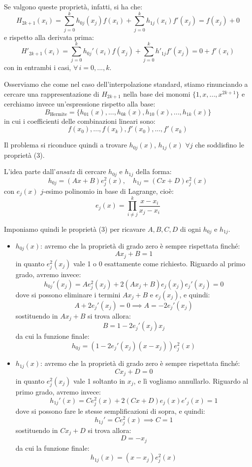 \documentclass[a4paper,11pt]{article}
\begin{document}
Se valgono queste proprietà, infatti, si ha che:
$$
H_{2k + 1}(x_i) = \sum_{j = 0}^k h_{0j}(x_j) f(x_i) + \sum_{j = 0}^k h_{1j}(x_i) f'(x_j) = f(x_j) + 0 
$$
e rispetto alla derivata prima:
$$
H'_{2k + 1}(x_i) = \sum_{j = 0}^k h_{0j}'(x_i) f(x_j) + \sum_{j = 0}^k h'_{1j}f'(x_j) = 0 + f'(x_i)
$$
con in entrambi i casi, $\forall \, i = 0, ..., k$.

Osserviamo che come nel caso dell'interpolazione standard, stiamo rinunciando a cercare una rappresentazione di $H_{2k + 1}$ nella base dei monomi $\{ 1, x, ..., x^{2k + 1} \}$ e cerchiamo invece un'espressione rispetto alla base:
$$
	B_\text{Hermite} = \{ h_{01}(x), ..., h_{0k}(x), h_{10}(x), ..., h_{1k}(x) \}
$$
in cui i coefficienti delle combinazioni lineari sono:
$$
f(x_0), ..., f(x_k), f'(x_0), ..., f'(x_k)
$$

Il problema si riconduce quindi a trovare $h_{0j}(x)$, $h_{1j}(x)$ $\forall j$ che soddisfino le proprietà (3).

L'idea parte dall'\textit{ansatz} di cercare $h_{0j}$ e $h_{1j}$ della forma:
$$
h_{0j} = (Ax + B) e_j^2(x), \quad h_{1j} = (Cx + D) e_j^2(x)
$$
con $e_j(x)$ $j$-esimo polinomio in base di Lagrange, cioè:
$$
e_j(x) = \prod_{i \neq j}^k \frac{x - x_i}{x_j - x_i}
$$

Imponiamo quindi le proprietà (3) per ricavare $A, B, C, D$ di ogni $h_{0j}$ e $h_{1j}$.
\begin{itemize}
	\item $h_{0j}(x)$: avremo che la proprietà di grado zero è sempre rispettata finché:
		$$
		A x_j + B = 1
		$$
		in quanto $e_j^2(x_j)$ vale 1 o 0 esattamente come richiesto.
		Riguardo al primo grado, avremo invece:
		$$
		h_{0j}'(x_j) = A e_j^2 (x_j) + 2 (A x_j + B) e_j(x_j) e_j'(x_j) = 0
		$$
		dove si possono eliminare i termini $A x_j + B$ e $e_j(x_j)$, e quindi:
		$$
		A + 2 e_j'(x_j) = 0 \implies A = - 2 e_j'(x_j) 
		$$
		sostituendo in $Ax_j + B$ si trova allora:
		$$
		B = 1-2 e_j'(x_j) x_j
		$$
		da cui la funzione finale:
		$$
		h_{0j} = \left( 1 - 2 e_j'(x_j) (x - x_j) \right) e_j^2(x)
		$$

	\item $h_{1j}(x)$: avremo che la proprietà di grado zero è sempre rispettata finché:
		$$
		C x_j + D = 0
		$$
		in quanto $e_j^2(x_j)$ vale 1 soltanto in $x_j$, e lì vogliamo annullarlo.
		Riguardo al primo grado, avremo invece:
		$$
		h_{1j}' (x) = C e_j^2 (x) + 2 (Cx + D) e_j(x) e'_j(x) = 1
		$$
		dove si possono fare le stesse semplificazioni di sopra, e quindi:
		$$
		h_{1j}' = C e_j^2(x) \implies C = 1
		$$
		sostituendo in $Cx_j + D$ si trova allora:
		$$
		D = - x_j
		$$
		da cui la funzione finale:
		$$
		h_{1j}(x) = (x - x_j) e^2_j(x)
		$$
\end{itemize}
\end{document}
